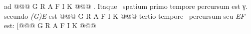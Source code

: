 {{                %
                     ad @@@ G R A F I K @@@%
                    }{. Itaque \ spatium primo tempore percursum est γ. secundo \textit{(G)E} est @@@ G R A F I K @@@%
                     tertio tempore \ percursum seu \textit{EF} est: [@@@ G R A F I K @@@%
}}
